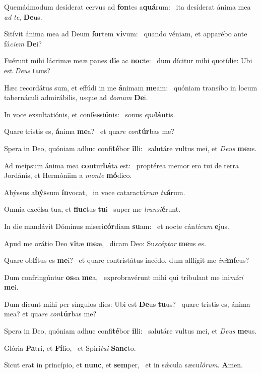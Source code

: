 \item Quemádmodum desíderat cervus ad \textbf{fon}tes a\textbf{quá}rum:~\psstar{} ita desíderat ánima mea \textit{ad} \textit{te}, \textbf{De}us.
\item Sitívit ánima mea ad Deum \textbf{for}tem \textbf{vi}vum:~\psstar{} quando véniam, et apparébo ante fá\textit{ciem} \textbf{De}i?
\item Fuérunt mihi lácrimæ meæ panes \textbf{di}e ac \textbf{noc}te:~\psstar{} dum dícitur mihi quotídie: Ubi est \textit{Deus} \textbf{tu}us?
\item Hæc recordátus sum, et effúdi in me \textbf{á}nimam \textbf{me}am:~\psstar{} quóniam transíbo in locum tabernáculi admirábilis, usque ad \textit{domum} \textbf{De}i.
\item In voce exsultatiónis, et con\textbf{fes}si\textbf{ó}nis:~\psstar{} sonus \textit{epu}\textbf{lán}tis.
\item Quare tristis es, \textbf{á}nima \textbf{me}a?~\psstar{} et qua\textit{re} \textit{con}\textbf{túr}bas me?
\item Spera in Deo, quóniam adhuc confi\textbf{té}bor \textbf{il}li:~\psstar{} salutáre vultus mei, et \textit{Deus} \textbf{me}us.
\item Ad meípsum ánima mea \textbf{con}tur\textbf{bá}ta est:~\psstar{} proptérea memor ero tui de terra Jordánis, et Hermóniim a \textit{monte} \textbf{mó}dico.
\item Abýssus a\textbf{býs}sum \textbf{ín}vocat,~\psstar{} in voce cataractá\textit{rum} \textit{tu}\textbf{á}rum.
\item Omnia excélsa tua, et \textbf{fluc}tus \textbf{tu}i~\psstar{} super me \textit{transi}\textbf{é}runt.
\item In die mandávit Dóminus miseri\textbf{cór}diam \textbf{su}am:~\psstar{} et nocte cán\textit{ticum} \textbf{e}jus.
\item Apud me orátio Deo \textbf{vi}tæ \textbf{me}æ,~\psstar{} dicam Deo: Su\textit{scéptor} \textbf{me}us es.
\item Quare ob\textbf{lí}tus es \textbf{me}i?~\psstar{} et quare contristátus incédo, dum afflígit me \textit{ini}\textbf{mí}cus?
\item Dum confringúntur \textbf{os}sa \textbf{me}a,~\psstar{} exprobravérunt mihi qui tríbulant me ini\textit{míci} \textbf{me}i.
\item Dum dicunt mihi per síngulos dies: Ubi est \textbf{De}us \textbf{tu}us?~\psstar{} quare tristis es, ánima mea? et qua\textit{re} \textit{con}\textbf{túr}bas me?
\item Spera in Deo, quóniam adhuc confi\textbf{té}bor \textbf{il}li:~\psstar{} salutáre vultus mei, et \textit{Deus} \textbf{me}us.
\item Glória \textbf{Pa}tri, et \textbf{Fí}lio,~\psstar{} et Spirí\textit{tui} \textbf{Sanc}to.
\item Sicut erat in princípio, et \textbf{nunc}, et \textbf{sem}per,~\psstar{} et in sǽcula sæcu\textit{lórum}. \textbf{A}men.